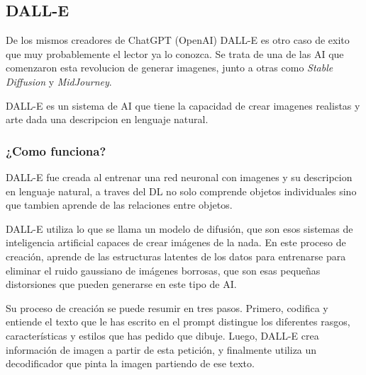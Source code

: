\documentclass[runningheads]{llncs} %
\begin{document}


\newpage
\subsection{DALL-E}
De los mismos creadores de ChatGPT (OpenAI) DALL-E es otro caso de exito que muy
probablemente el lector ya lo conozca. Se trata  de una de las AI que comenzaron
esta revolucion de generar imagenes, junto a otras como \textit{Stable Diffusion}
y \textit{MidJourney}. \cite{dalle-xtaka}

DALL-E es un sistema de AI que tiene la capacidad de crear imagenes realistas y arte
dada una descripcion en lenguaje natural. \cite{ej-dalle}

\subsubsection{¿Como funciona?}
DALL-E fue creada al entrenar una red neuronal con imagenes y su descripcion en lenguaje
natural, a traves del DL no solo comprende objetos individuales sino que tambien aprende 
de las relaciones entre objetos. \cite{ej-dalle}

DALL-E utiliza lo que se llama un modelo de difusión, que son esos sistemas 
de inteligencia artificial capaces de crear imágenes de la nada. 
En este proceso de creación, aprende de las estructuras latentes de los datos 
para entrenarse para eliminar el ruido gaussiano de imágenes borrosas, 
que son esas pequeñas distorsiones que pueden generarse en este tipo de AI. 
\cite{dalle-xtaka}

Su proceso de creación se puede resumir en tres pasos. 
Primero, codifica y entiende el texto que le has escrito en el prompt 
distingue los diferentes rasgos, características y estilos que has pedido que dibuje.
Luego, DALL-E crea información de imagen a partir de esta petición, y finalmente 
utiliza un decodificador que pinta la imagen partiendo de ese texto. \cite{dalle-xtaka}
\end{document}
